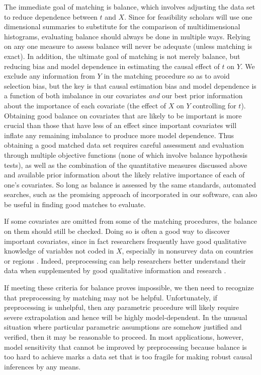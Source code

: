 \documentclass[11pt,titlepage]{article}
\begin{document}
The immediate goal of matching is balance, which involves adjusting
the data set to reduce dependence between $t$ and $X$.  Since for
feasibility scholars will use one dimensional summaries to substitute
for the comparison of multidimensional histograms, evaluating balance
should always be done in multiple ways.  Relying on any one measure to
assess balance will never be adequate (unless matching is exact).  In
addition, the ultimate goal of matching is not merely balance, but
reducing bias and model dependence in estimating the causal effect of
$t$ on $Y$.  We exclude any information from $Y$ in the matching
procedure so as to avoid selection bias, but the key is that causal
estimation bias and model dependence is a function of both imbalance
in our covariates \emph{and} our best prior information about the
importance of each covariate (the effect of $X$ on $Y$ controlling for
$t$).  Obtaining good balance on covariates that are likely to be
important is more crucial than those that have less of an effect since
important covariates will inflate any remaining imbalance to produce
more model dependence.  Thus obtaining a good matched data set
requires careful assessment and evaluation through multiple objective
functions (none of which involve balance hypothesis tests), as well as
the combination of the quantitative measures discussed above and
available prior information about the likely relative importance of
each of one's covariates.  So long as balance is assessed by the same
standards, automated searches, such as the promising approach of
\citet{DiaSek05} incorporated in our software, can also be useful in
finding good matches to evaluate.

If some covariates are omitted from some of the matching procedures,
the balance on them should still be checked.  Doing so is often a good
way to discover important covariates, since in fact researchers
frequently have good qualitative knowledge of variables not coded in
$X$, especially in nonsurvey data on countries or regions
\citep[][Ch.3]{Rosenbaum02}.  Indeed, preprocessing can help
researchers better understand their data when supplemented by good
qualitative information and research \citep[e.g.,][]{RosSil01}.

If meeting these criteria for balance proves impossible, we then need
to recognize that preprocessing by matching may not be helpful.
Unfortunately, if preprocessing is unhelpful, then any parametric
procedure will likely require severe extrapolation and hence will be
highly model-dependent.  In the unusual situation where particular
parametric assumptions are somehow justified and verified, then it may
be reasonable to proceed.  In most applications, however, model
sensitivity that cannot be improved by preprocessing because balance
is too hard to achieve marks a data set that is too fragile for making
robust causal inferences by any means.
\end{document}
